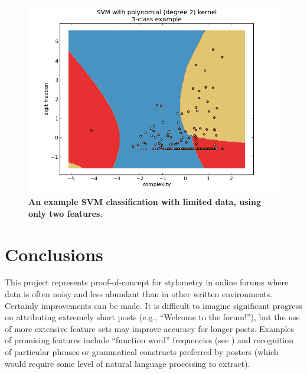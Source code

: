 \documentclass[12pt,letterpaper,onecolumn,oneside]{article}
\numberwithin{equation}{section}
\numberwithin{figure}{section}
\begin{document}
\begin{figure}[H]
 \centering
  \includegraphics[scale=0.4]{SVMpic.png}
  \caption{\textbf{\footnotesize{An example SVM classification with limited data, using only two features.}}}
  \label{SVM_pic}
\end{figure}

\section{Conclusions}
This project represents proof-of-concept for stylometry in online forums where data is often noisy and less abundant than in other written environments. Certainly improvements can be made. It is difficult to 
imagine significant progress on attributing extremely short posts (e.g., ``Welcome to the forum!''), but the use of more extensive feature sets may improve accuracy for longer posts. Examples of promising features 
include ``function word'' frequencies (see \cite{stanford}) and recognition of particular phrases or grammatical constructs preferred by posters (which would require some level of natural language processing to 
extract). 
\end{document}
